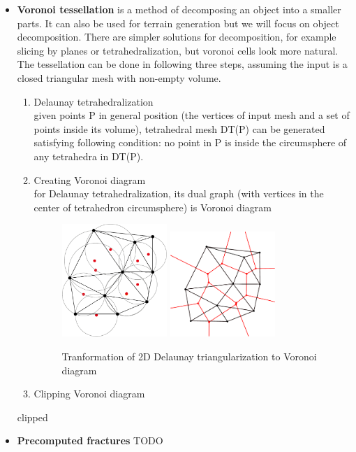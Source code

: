 \begin{itemize}
\item \textbf{Voronoi tessellation} is a method of decomposing an object into a smaller parts. It can also be used for terrain generation but we will focus on object decomposition. There are simpler solutions for decomposition, for example slicing by planes or tetrahedralization, but voronoi cells look more natural. The tessellation can be done in following three steps, assuming the input is a closed triangular mesh with non-empty volume.
\begin{enumerate}
	\item Delaunay tetrahedralization \\ given points P in general position (the vertices of input mesh and a set of points inside its volume), tetrahedral mesh DT(P) can be generated satisfying following condition: no point in P is inside the circumsphere of any tetrahedra in DT(P).
    \item Creating Voronoi diagram \\ for Delaunay tetrahedralization, its dual graph (with vertices in the center of tetrahedron circumsphere) is Voronoi diagram
    \begin{figure}[ht!]
		\label{DT}
        \centering
        \includegraphics[width=0.4\textwidth]{img/delaunay}
        \includegraphics[width=0.4\textwidth]{img/voronoi}
		\caption{Tranformation of 2D Delaunay triangularization to Voronoi diagram}
	\end{figure}
    \item Clipping Voronoi diagram \\ 
    
\end{enumerate}

clipped \cite{yan2010efficient}

\item \textbf{Precomputed fractures} TODO

\end{itemize}



